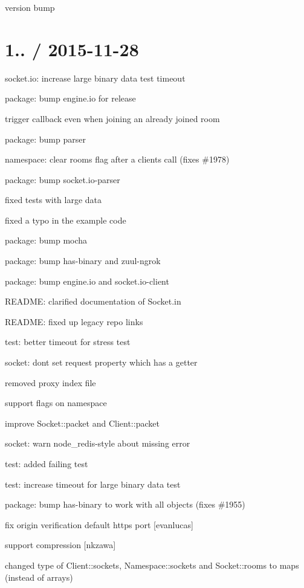 \begin{DoxyItemize}
\item version bump
\end{DoxyItemize}

\section*{1.. / 2015-\/11-\/28 }


\begin{DoxyItemize}
\item socket.\+io\+: increase large binary data test timeout
\item package\+: bump {\ttfamily engine.\+io} for release
\item trigger callback even when joining an already joined room
\item package\+: bump parser
\item namespace\+: clear rooms flag after a clients call (fixes \#1978)
\item package\+: bump {\ttfamily socket.\+io-\/parser}
\item fixed tests with large data
\item fixed a typo in the example code
\item package\+: bump mocha
\item package\+: bump {\ttfamily has-\/binary} and {\ttfamily zuul-\/ngrok}
\item package\+: bump {\ttfamily engine.\+io} and {\ttfamily socket.\+io-\/client}
\item R\+E\+A\+D\+ME\+: clarified documentation of Socket.\+in
\item R\+E\+A\+D\+ME\+: fixed up legacy repo links
\item test\+: better timeout for stress test
\item socket\+: don\textquotesingle{}t set request property which has a getter
\item removed proxy index file
\item support flags on namespace
\item improve Socket\+::packet and Client\+::packet
\item socket\+: warn node\+\_\+redis-\/style about missing {\ttfamily error}
\item test\+: added failing test
\item test\+: increase timeout for large binary data test
\item package\+: bump {\ttfamily has-\/binary} to work with all objects (fixes \#1955)
\item fix origin verification default https port \mbox{[}evanlucas\mbox{]}
\item support compression \mbox{[}nkzawa\mbox{]}
\item changed type of {\ttfamily Client\+::sockets}, {\ttfamily Namespace\+::sockets} and {\ttfamily Socket\+::rooms} to maps (instead of arrays)
\end{DoxyItemize}

